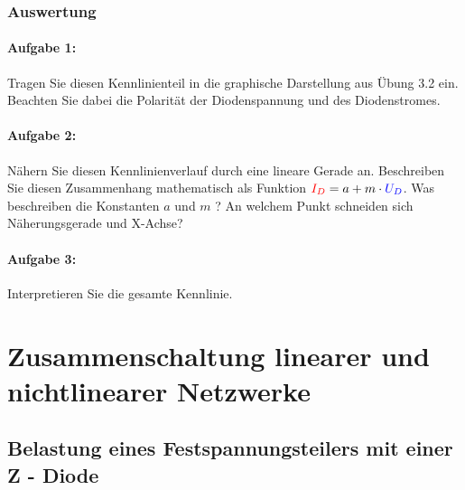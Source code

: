 \documentclass[11pt,a4paper,titlepage,parskip=half]{scrreprt}
\begin{document}
         \subsection{Auswertung}
            \subsubsection{Aufgabe 1:} Tragen Sie diesen Kennlinienteil in die graphische Darstellung aus Übung 3.2 ein. Beachten Sie dabei die Polarität der Diodenspannung und des Diodenstromes.

           \subsubsection{Aufgabe 2:} Nähern Sie diesen Kennlinienverlauf durch eine lineare Gerade an. Beschreiben Sie diesen Zusammenhang mathematisch als Funktion $\textcolor{red}{I_D} = a + m \cdot \textcolor{blue}{U_D}$. Was beschreiben die Konstanten $a$ und $m$ ? An welchem Punkt schneiden sich Näherungsgerade und X-Achse?
    

           \subsubsection{Aufgabe 3:} Interpretieren Sie die gesamte Kennlinie.
           


    \chapter{Zusammenschaltung linearer und nichtlinearer Netzwerke}


        \section{Belastung eines Festspannungsteilers mit einer Z - Diode}
\end{document}
